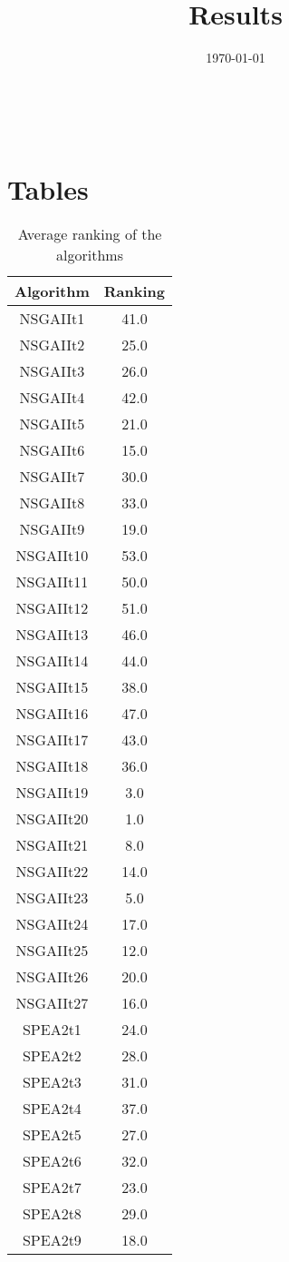 \documentclass{article}
\title{Results}
\author{}
\date{\today}
\begin{document}
\oddsidemargin 0in \topmargin 0in\maketitle
\
\section{Tables}
\begin{table}[!htp]
\centering
\caption{Average ranking of the algorithms}
\begin{tabular}{c|c}
Algorithm&Ranking\\
\hline
NSGAIIt1&41.0\\
NSGAIIt2&25.0\\
NSGAIIt3&26.0\\
NSGAIIt4&42.0\\
NSGAIIt5&21.0\\
NSGAIIt6&15.0\\
NSGAIIt7&30.0\\
NSGAIIt8&33.0\\
NSGAIIt9&19.0\\
NSGAIIt10&53.0\\
NSGAIIt11&50.0\\
NSGAIIt12&51.0\\
NSGAIIt13&46.0\\
NSGAIIt14&44.0\\
NSGAIIt15&38.0\\
NSGAIIt16&47.0\\
NSGAIIt17&43.0\\
NSGAIIt18&36.0\\
NSGAIIt19&3.0\\
NSGAIIt20&1.0\\
NSGAIIt21&8.0\\
NSGAIIt22&14.0\\
NSGAIIt23&5.0\\
NSGAIIt24&17.0\\
NSGAIIt25&12.0\\
NSGAIIt26&20.0\\
NSGAIIt27&16.0\\
SPEA2t1&24.0\\
SPEA2t2&28.0\\
SPEA2t3&31.0\\
SPEA2t4&37.0\\
SPEA2t5&27.0\\
SPEA2t6&32.0\\
SPEA2t7&23.0\\
SPEA2t8&29.0\\
SPEA2t9&18.0\\

\end{tabular}
\end{table}
\end{document}
